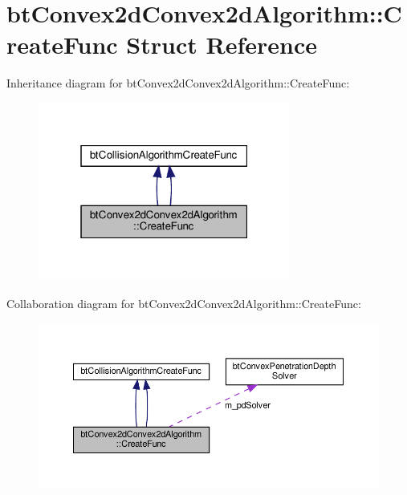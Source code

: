 \hypertarget{structbtConvex2dConvex2dAlgorithm_1_1CreateFunc}{}\section{bt\+Convex2d\+Convex2d\+Algorithm\+:\+:Create\+Func Struct Reference}
\label{structbtConvex2dConvex2dAlgorithm_1_1CreateFunc}


Inheritance diagram for bt\+Convex2d\+Convex2d\+Algorithm\+:\+:Create\+Func\+:
\nopagebreak
\begin{figure}[H]
\begin{center}
\leavevmode
\includegraphics[width=235pt]{structbtConvex2dConvex2dAlgorithm_1_1CreateFunc__inherit__graph}
\end{center}
\end{figure}


Collaboration diagram for bt\+Convex2d\+Convex2d\+Algorithm\+:\+:Create\+Func\+:
\nopagebreak
\begin{figure}[H]
\begin{center}
\leavevmode
\includegraphics[width=350pt]{structbtConvex2dConvex2dAlgorithm_1_1CreateFunc__coll__graph}
\end{center}
\end{figure}
